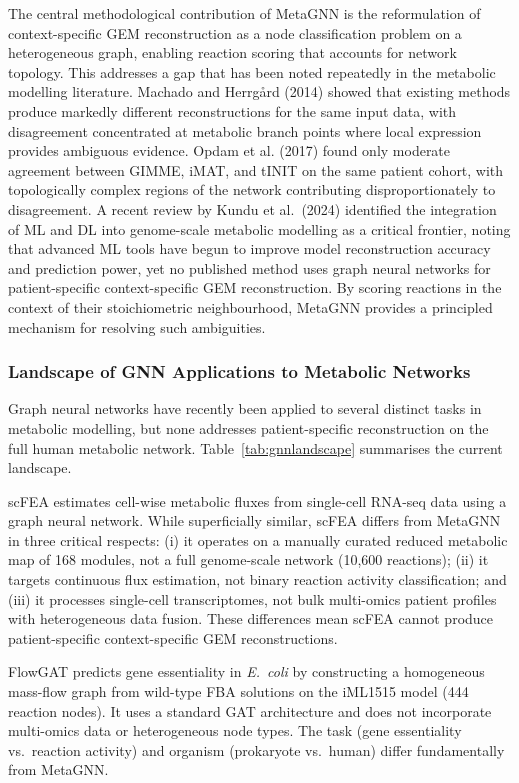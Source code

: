 \documentclass[12pt,a4paper]{article}
\begin{document}
The central methodological contribution of MetaGNN is the reformulation of context-specific GEM reconstruction as a node classification problem on a heterogeneous graph, enabling reaction scoring that accounts for network topology. This addresses a gap that has been noted repeatedly in the metabolic modelling literature. Machado and Herrg\r{a}rd (2014) showed that existing methods produce markedly different reconstructions for the same input data, with disagreement concentrated at metabolic branch points where local expression provides ambiguous evidence. Opdam et al. (2017) found only moderate agreement between GIMME, iMAT, and tINIT on the same patient cohort, with topologically complex regions of the network contributing disproportionately to disagreement. A recent review by Kundu et al.\ (2024) \cite{Kundu2024} identified the integration of ML and DL into genome-scale metabolic modelling as a critical frontier, noting that advanced ML tools have begun to improve model reconstruction accuracy and prediction power, yet no published method uses graph neural networks for patient-specific context-specific GEM reconstruction. By scoring reactions in the context of their stoichiometric neighbourhood, MetaGNN provides a principled mechanism for resolving such ambiguities.

\subsubsection{Landscape of GNN Applications to Metabolic Networks}

Graph neural networks have recently been applied to several distinct tasks in metabolic modelling, but none addresses patient-specific reconstruction on the full human metabolic network. Table~\ref{tab:gnnlandscape} summarises the current landscape.

scFEA \cite{Alghamdi2021} estimates cell-wise metabolic fluxes from single-cell RNA-seq data using a graph neural network. While superficially similar, scFEA differs from MetaGNN in three critical respects: (i) it operates on a manually curated reduced metabolic map of 168 modules, not a full genome-scale network (10,600 reactions); (ii) it targets continuous flux estimation, not binary reaction activity classification; and (iii) it processes single-cell transcriptomes, not bulk multi-omics patient profiles with heterogeneous data fusion. These differences mean scFEA cannot produce patient-specific context-specific GEM reconstructions.

FlowGAT \cite{Gao2024} predicts gene essentiality in \textit{E.\ coli} by constructing a homogeneous mass-flow graph from wild-type FBA solutions on the iML1515 model (444 reaction nodes). It uses a standard GAT architecture and does not incorporate multi-omics data or heterogeneous node types. The task (gene essentiality vs.\ reaction activity) and organism (prokaryote vs.\ human) differ fundamentally from MetaGNN.
\end{document}
